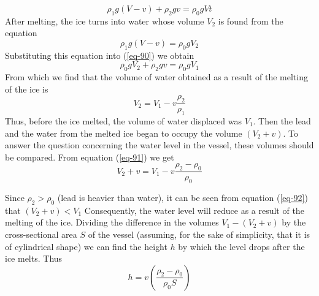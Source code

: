 \documentclass[a4paper,sfsidenotes]{tufte-book}
\begin{document}
\begin{equation}%
\rho_{1} g (V-v) + \rho_{2}g v = \rho_{0}g V t
\label{eq-90}
\end{equation}
After melting, the ice turns into water whose volume $V_{2}$ is found from the equation\\
\begin{equation*}
\rho_{1} g (V-v) = \rho_{0} gV_{2}
\end{equation*}
Substituting this equation into (\ref{eq-90}) we obtain
\begin{equation*}%
\rho_{0}gV_{2} + \rho_{2}gv = \rho_{0}gV_{1}
\end{equation*}
From which we find that the volume of water obtained as a result of the melting of the ice is
\begin{equation}%
V_{2} = V_{1} -v \frac{\rho_{2}}{\rho_{1}}
\label{eq-91}
\end{equation}
Thus, before the ice melted, the volume of water displaced was $V_{1}$. Then the lead and the water from the melted ice began to occupy the volume $(V_{2}+v)$. To answer the question concerning the water level in the vessel, these volumes should be compared. From equation (\ref{eq-91}) we get
\\
\begin{equation}%
V_{2} + v= V_{1} - v \frac{\rho_{2}-\rho_{0}}{\rho_{0}}
\label{eq-92}
\end{equation}


Since $\rho_{2} > \rho_{0}$ (lead is heavier than water), it can be seen from equation (\ref{eq-92}) that $(V_{2}+v)<V_{1}$ Consequently, the water level will reduce as a result of the melting of the ice. Dividing the difference in the volumes $V_{1} - (V_{2}+v)$ by the cross-sectional area $S$ of the vessel (assuming, for the sake of simplicity, that it is of cylindrical shape) we can find the height $h$ by which the level drops after the ice melts. Thus
\begin{equation}
h= v \left( \frac{\rho_{2}-\rho_{0}}{\rho_{0}S} \right)
\label{eq-93}
\end{equation}
\end{document}
